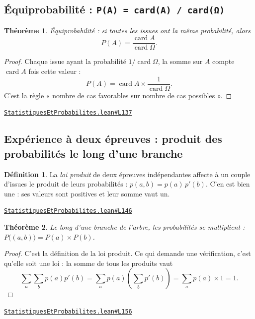 \documentclass[11pt,a4paper]{article}
\theoremstyle{definition}
\newtheorem{definition}{Définition}
\theoremstyle{plain}
\newtheorem{theoreme}{Théorème}
\newcommand{\source}[2]{\par\smallskip\noindent\hfill{\footnotesize\href{#1}{\texttt{#2}}}\par\smallskip}
\begin{document}
\subsection{Équiprobabilité : \texttt{P(A) = card(A) / card(Ω)}}

\begin{theoreme}
Équiprobabilité : si toutes les issues ont la même probabilité, alors
\[ P(A) = \frac{\operatorname{card} A}{\operatorname{card} \Omega} . \]
\end{theoreme}

\begin{proof}
Chaque issue ayant la probabilité $1/\operatorname{card}\Omega$, la somme sur $A$
compte $\operatorname{card} A$ fois cette valeur :
\[ P(A) = \operatorname{card} A \times \frac{1}{\operatorname{card}\Omega} . \]
C'est la règle « nombre de cas favorables sur nombre de cas possibles ».
\end{proof}
\source{https://github.com/Commutator-IO/learn-lean/blob/main/cours/01-college/06-statistiques-et-probabilites/StatistiquesEtProbabilites.lean\#L137}{StatistiquesEtProbabilites.lean\#L137}

\subsection{Expérience à deux épreuves : produit des probabilités le long d'une branche}

\begin{definition}
La \emph{loi produit} de deux épreuves indépendantes affecte à un couple d'issues le
produit de leurs probabilités : $p(a, b) = p(a)\,p'(b)$. C'en est bien une : ses valeurs
sont positives et leur somme vaut un.
\end{definition}
\source{https://github.com/Commutator-IO/learn-lean/blob/main/cours/01-college/06-statistiques-et-probabilites/StatistiquesEtProbabilites.lean\#L146}{StatistiquesEtProbabilites.lean\#L146}

\begin{theoreme}
Le long d'une branche de l'arbre, les probabilités se multiplient :
$P\bigl((a, b)\bigr) = P(a) \times P(b)$.
\end{theoreme}

\begin{proof}
C'est la définition de la loi produit. Ce qui demande une vérification, c'est qu'elle
soit une loi : la somme de tous les produits vaut
\[ \sum_{a}\sum_{b} p(a)p'(b) = \sum_a p(a) \left(\sum_b p'(b)\right)
   = \sum_a p(a) \times 1 = 1 . \]
\end{proof}
\source{https://github.com/Commutator-IO/learn-lean/blob/main/cours/01-college/06-statistiques-et-probabilites/StatistiquesEtProbabilites.lean\#L156}{StatistiquesEtProbabilites.lean\#L156}
\end{document}
